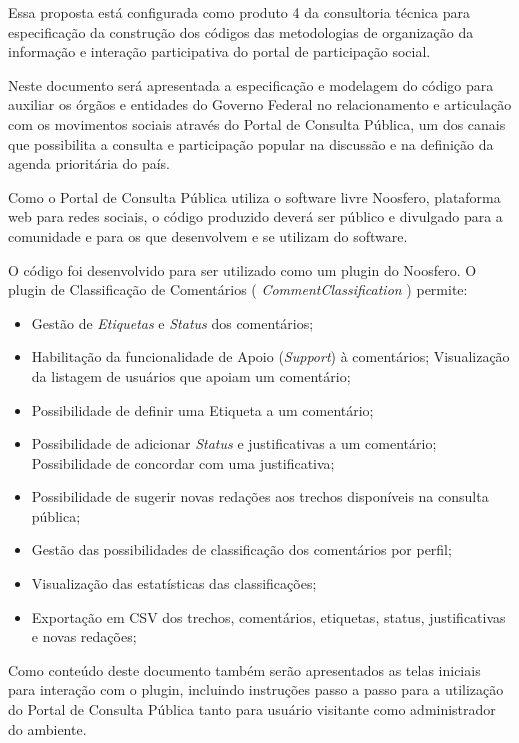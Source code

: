 \documentclass[11pt]{article}
\begin{document}
Essa proposta está configurada como produto 4 da consultoria técnica
para especificação da construção dos códigos das metodologias de
organização da informação e interação participativa do portal de
participação social.

Neste documento será apresentada a especificação e
modelagem do código para auxiliar os órgãos e entidades do
Governo Federal no relacionamento e articulação com os movimentos
sociais através do Portal de Consulta Pública, um dos canais que
possibilita a consulta e participação popular na discussão e na definição
da agenda prioritária do país.

Como o Portal de Consulta Pública utiliza o software livre Noosfero,
plataforma web para redes sociais, o código produzido deverá ser público
e divulgado para a comunidade e para os que desenvolvem e se utilizam do
software.

O código foi desenvolvido para ser utilizado como um plugin do Noosfero.
O plugin de Classificação de Comentários ( {\it CommentClassification} )
permite:

\begin{itemize}
  \item Gestão de {\it Etiquetas} e {\it Status} dos comentários;
  \item Habilitação da funcionalidade de Apoio ({\it Support}) à
comentários;
    \subitem Visualização da listagem de usuários que apoiam um comentário;
  \item Possibilidade de definir uma Etiqueta a um comentário;
  \item Possibilidade de adicionar {\it Status} e justificativas a um
comentário;
    \subitem Possibilidade de concordar com uma justificativa;
  \item Possibilidade de sugerir novas redações aos trechos disponíveis
na consulta pública;
  \item Gestão das possibilidades de classificação dos comentários por
perfil;
  \item Visualização das estatísticas das classificações;
  \item Exportação em CSV dos trechos, comentários, etiquetas, status,
justificativas e novas redações;
\end{itemize}

Como conteúdo deste documento também serão apresentados as telas
iniciais para interação com o plugin, incluindo instruções passo a
passo para a utilização do Portal de Consulta Pública tanto para usuário
visitante como administrador do ambiente.
\end{document}
